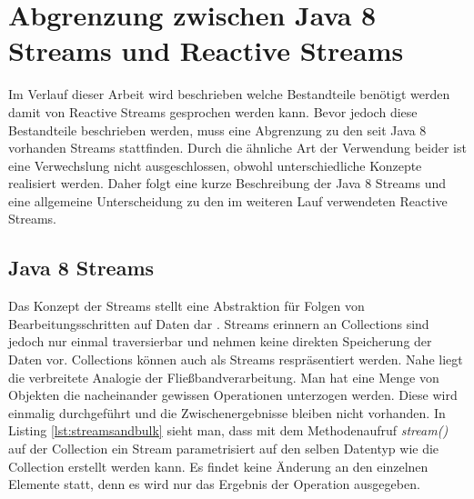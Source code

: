 \chapter{Abgrenzung zwischen Java 8 Streams und Reactive Streams}\label{streams}
Im Verlauf dieser Arbeit wird beschrieben welche Bestandteile benötigt werden damit von Reactive Streams gesprochen werden kann. Bevor jedoch diese Bestandteile beschrieben werden, muss eine Abgrenzung zu den seit Java 8 vorhanden Streams stattfinden. Durch die ähnliche Art der Verwendung beider ist eine Verwechslung nicht ausgeschlossen, obwohl unterschiedliche Konzepte realisiert werden. Daher folgt eine kurze Beschreibung der Java 8 Streams und eine allgemeine Unterscheidung zu den im weiteren Lauf verwendeten Reactive Streams.
\section{Java 8 Streams}
Das Konzept der Streams stellt eine Abstraktion für Folgen von Bearbeitungsschritten auf Daten dar \cite{Inden.2015}. Streams erinnern an Collections sind jedoch nur einmal traversierbar und nehmen keine direkten Speicherung der Daten vor. Collections können auch als Streams respräsentiert werden. Nahe liegt die verbreitete Analogie der Fließbandverarbeitung. Man hat eine Menge von Objekten die nacheinander gewissen Operationen unterzogen werden. Diese wird einmalig durchgeführt und die Zwischenergebnisse bleiben nicht vorhanden. In Listing \ref{lst:streamsandbulk} sieht man, dass mit dem Methodenaufruf \textit{stream()} auf der Collection ein Stream parametrisiert auf den selben Datentyp wie die Collection erstellt werden kann. Es findet keine Änderung an den einzelnen Elemente statt, denn es wird nur das Ergebnis der Operation ausgegeben.

